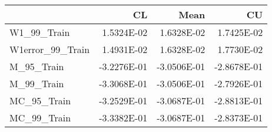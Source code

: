 \begin{tabular}{lrrr}
\toprule
{} &          CL &        Mean &          CU \\
\midrule
W1\_99\_Train      &  1.5324E-02 &  1.6328E-02 &  1.7425E-02 \\
W1error\_99\_Train &  1.4931E-02 &  1.6328E-02 &  1.7730E-02 \\
M\_95\_Train       & -3.2276E-01 & -3.0506E-01 & -2.8678E-01 \\
M\_99\_Train       & -3.3068E-01 & -3.0506E-01 & -2.7926E-01 \\
MC\_95\_Train      & -3.2529E-01 & -3.0687E-01 & -2.8813E-01 \\
MC\_99\_Train      & -3.3382E-01 & -3.0687E-01 & -2.8373E-01 \\
\bottomrule
\end{tabular}
